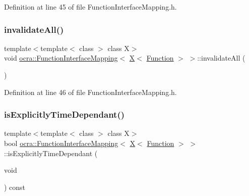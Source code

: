 Definition at line 45 of file Function\+Interface\+Mapping.\+h.

\hypertarget{structocra_1_1FunctionInterfaceMapping_3_01X_3_01Function_01_4_01_4_a1c8b1fac294850b4b70641761acc2542}{}\label{structocra_1_1FunctionInterfaceMapping_3_01X_3_01Function_01_4_01_4_a1c8b1fac294850b4b70641761acc2542} 
\subsubsection{\texorpdfstring{invalidate\+All()}{invalidateAll()}}
{\footnotesize\ttfamily template$<$template$<$ class $>$ class X$>$ \\
void \hyperlink{structocra_1_1FunctionInterfaceMapping}{ocra\+::\+Function\+Interface\+Mapping}$<$ \hyperlink{namespaceocra_a436781c7059a0f76027df1c652126260a53f3cfeeb322946db40cd86dfebfb237}{X}$<$ \hyperlink{classocra_1_1Function}{Function} $>$ $>$\+::invalidate\+All (\begin{DoxyParamCaption}{ }\end{DoxyParamCaption})\hspace{0.3cm}{\ttfamily [inline]}}



Definition at line 46 of file Function\+Interface\+Mapping.\+h.

\hypertarget{structocra_1_1FunctionInterfaceMapping_3_01X_3_01Function_01_4_01_4_a7fb5dac6a6f5657491398e5df37a4d66}{}\label{structocra_1_1FunctionInterfaceMapping_3_01X_3_01Function_01_4_01_4_a7fb5dac6a6f5657491398e5df37a4d66} 
\subsubsection{\texorpdfstring{is\+Explicitly\+Time\+Dependant()}{isExplicitlyTimeDependant()}}
{\footnotesize\ttfamily template$<$template$<$ class $>$ class X$>$ \\
bool \hyperlink{structocra_1_1FunctionInterfaceMapping}{ocra\+::\+Function\+Interface\+Mapping}$<$ \hyperlink{namespaceocra_a436781c7059a0f76027df1c652126260a53f3cfeeb322946db40cd86dfebfb237}{X}$<$ \hyperlink{classocra_1_1Function}{Function} $>$ $>$\+::is\+Explicitly\+Time\+Dependant (\begin{DoxyParamCaption}\item[{void}]{ }\end{DoxyParamCaption}) const\hspace{0.3cm}{\ttfamily [inline]}}



